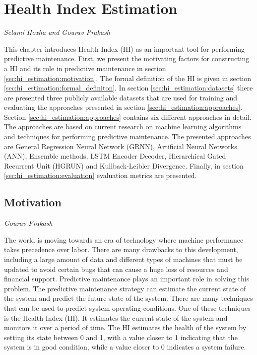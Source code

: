 %
\chapter{Health Index Estimation}
\vspace*{-15mm}\hfill{\normalsize\emph{Selami Hoxha and Gourav Prakash}}
\label{sec:hi_estimation}


This chapter introduces Health Index (HI) as an important tool for performing predictive maintenance. First, we
present the motivating factors for constructing a HI and its role in predictive maintenance in section \ref{sec:hi_estimation:motivation}.
The formal definition of the HI is given in section \ref{sec:hi_estimation:formal_definiton}. In section
\ref{sec:hi_estimation:datasets} there are presented three publicly available datasets that are used for training
and evaluating the approaches presented in section \ref{sec:hi_estimation:approaches}. Section
\ref{sec:hi_estimation:approaches} contains six different approaches in detail. The approaches are based on
current research on machine learning algorithms and techniques for performing predictive maintenance. The
presented approaches are General Regression Neural Network (GRNN), Artificial Neural Networks (ANN), Ensemble
methods, LSTM Encoder Decoder, Hierarchical Gated Recurrent Unit (HGRUN) and Kullback-Leibler Divergence. Finally,
in section \ref{sec:hi_estimation:evaluation} evaluation metrics are presented.


\section{Motivation}
\vspace*{-15mm}\hfill{\normalsize\emph{Gourav Prakash}}
\label{sec:hi_estimation:motivation}

The world is moving towards an era of technology where machine performance takes precedence over labor. There are
many drawbacks to this development, including a large amount of data and different types of machines that must be
updated to avoid certain bugs that can cause a huge loss of resources and financial support. Predictive maintenance
plays an important role in solving this problem. The predictive maintenance strategy can estimate the current state
of the system and predict the future state of the system. There are many techniques that can be used to predict
system operating conditions. One of these techniques is the Health Index (HI). It estimates the current state of
the system and monitors it over a period of time. The HI estimates the health of
the system by setting its state between 0 and 1, with a value closer to 1 indicating that the system is in good
condition, while a value closer to 0 indicates a system failure.

